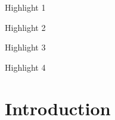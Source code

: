 \documentclass[review,12pt,authoryear]{elsarticle}
\begin{document}
\begin{linenumbers}
\begin{frontmatter}
\begin{highlights}
 \item Highlight 1
 \item Highlight 2
 \item Highlight 3
 \item Highlight 4
\end{highlights}
\end{frontmatter}


%







\section{Introduction}


\end{linenumbers}
\end{document}
